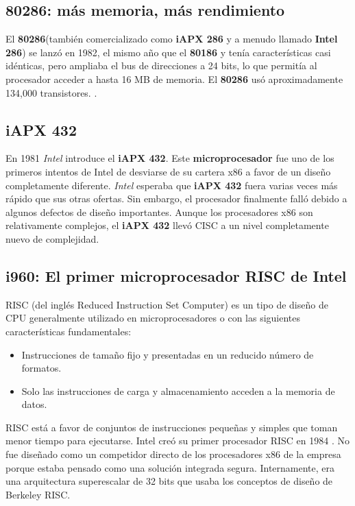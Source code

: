 \subsection{\textbf{80286}: más memoria, más rendimiento}
El \textbf{80286}(también comercializado como \textbf{iAPX 286} y a menudo llamado \textbf{Intel 286}) se lanzó en 1982, el mismo año que el \textbf{80186} y tenía
características casi idénticas, pero ampliaba el bus de direcciones a 24 bits, lo que permitía al procesador acceder a hasta 16 MB de memoria.
El \textbf{80286} usó aproximadamente 134,000 transistores. .

\subsection{iAPX 432}
En 1981 \emph{Intel}  introduce el \textbf{iAPX 432}. Este \textbf{microprocesador} fue uno de los primeros intentos de Intel de desviarse de su cartera x86 a favor de un 
diseño completamente diferente. \emph{Intel} esperaba que \textbf{iAPX 432} fuera varias veces más rápido que sus otras ofertas. Sin embargo, el procesador 
finalmente falló debido a algunos defectos de diseño importantes. Aunque los procesadores x86 son relativamente complejos, el \textbf{iAPX 432} 
llevó CISC a un nivel completamente nuevo de complejidad.

\subsection{i960: El primer microprocesador RISC de Intel}
RISC (del inglés Reduced Instruction Set Computer) es un tipo de diseño de CPU generalmente utilizado en microprocesadores o 
con las siguientes características fundamentales:

\begin{itemize}
	\item Instrucciones de tamaño fijo y presentadas en un reducido número de formatos.
	\item Solo las instrucciones de carga y almacenamiento acceden a la memoria de datos.
\end{itemize}

RISC está a favor de conjuntos de instrucciones pequeñas y simples que toman menor tiempo para ejecutarse.
Intel creó su primer procesador RISC en 1984 . No fue diseñado como un competidor directo de los procesadores 
x86 de la empresa porque estaba pensado como una solución integrada segura. Internamente, era una arquitectura superescalar de 32 bits que 
usaba los conceptos de diseño de Berkeley RISC.


